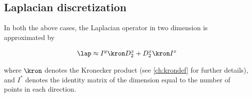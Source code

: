 \subsection{Laplacian discretization}

In both the above cases, the Laplacian operator in two dimension is approximated by 

\begin{equation}
    \lap \approx I^y \kron D_2^x + D_2^x \kron I^x
    \label{eq:lapprox}
\end{equation}

where $\kron$ denotes the Kronecker product (see \ref{ch:krondef} for further details), and $I^*$ denotes the identity matrix of the dimension equal to the number of points in each direction.
